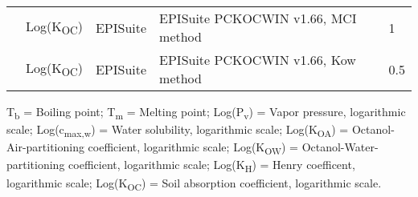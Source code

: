 \begin{landscape}
\begin{longtable}[c]{lllll}
          & Log(K\textsubscript{OC})      & EPISuite   & EPISuite PCKOCWIN v1.66, MCI method                                             & 1     \\
          & Log(K\textsubscript{OC})      & EPISuite   & EPISuite PCKOCWIN v1.66, Kow method                                             & 0.5  \\
          \hline
\end{longtable}
\begin{minipage}{1.4\textwidth}
\renewcommand{\footnoterule}{}
T\textsubscript{b} = Boiling point; T\textsubscript{m} = Melting point; Log(P\textsubscript{v}) = Vapor pressure, logarithmic scale; Log(c\textsubscript{max,w}) = Water solubility, logarithmic scale; Log(K\textsubscript{OA}) = Octanol-Air-partitioning coefficient, logarithmic scale; Log(K\textsubscript{OW}) = Octanol-Water-partitioning coefficient, logarithmic scale; Log(K\textsubscript{H}) = Henry coefficent, logarithmic scale; Log(K\textsubscript{OC}) = Soil absorption coefficient, logarithmic scale. 
\end{minipage}
\endgroup
\end{landscape}